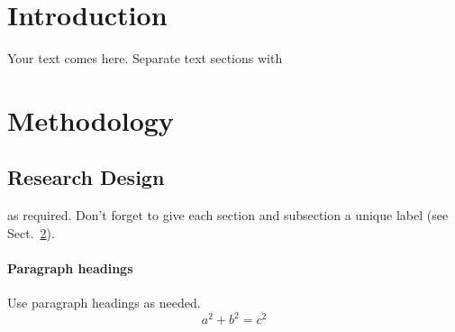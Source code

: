 \date{Received: date / Accepted: date}


\maketitle

\begin{abstract}
Insert your abstract here. Include keywords, PACS and mathematical
subject classification numbers as needed.
\end{abstract}

\section{Introduction}
\label{intro}
Your text comes here. Separate text sections with
\section{Methodology}
\label{sec:1}
\subsection{Research Design}
\label{sec:2}
as required. Don't forget to give each section
and subsection a unique label (see Sect.~\ref{sec:1}).
\paragraph{Paragraph headings} Use paragraph headings as needed.
\begin{equation}
a^2+b^2=c^2
\end{equation}

